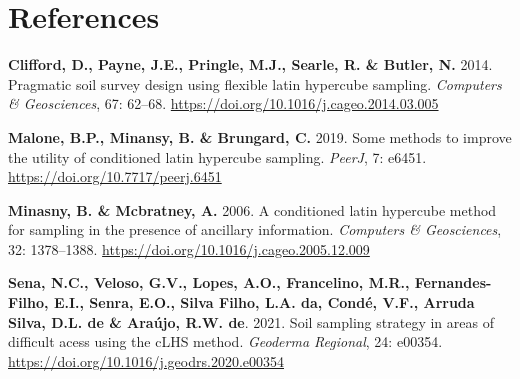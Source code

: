 \documentclass[
]{book}
\newlength{\cslhangindent}
\newlength{\cslentryspacingunit} %
\newenvironment{CSLReferences}[2] %
 {%
  \setlength{\parindent}{0pt}
  \ifodd #1
  \let\oldpar\par
  \def\par{\hangindent=\cslhangindent\oldpar}
  \fi
  \setlength{\parskip}{#2\cslentryspacingunit}
 }%
 {}
\begin{document}
\hypertarget{references}{%
\chapter*{References}\label{references}}

\hypertarget{refs}{}
\begin{CSLReferences}{0}{0}
\leavevmode{}%
\textbf{Clifford, D., Payne, J.E., Pringle, M.J., Searle, R. \& Butler, N.} 2014. Pragmatic soil survey design using flexible latin hypercube sampling. \emph{Computers \& Geosciences}, 67: 62--68. \url{https://doi.org/10.1016/j.cageo.2014.03.005}

\leavevmode{}%
\textbf{Malone, B.P., Minansy, B. \& Brungard, C.} 2019. Some methods to improve the utility of conditioned latin hypercube sampling. \emph{PeerJ}, 7: e6451. \url{https://doi.org/10.7717/peerj.6451}

\leavevmode{}%
\textbf{Minasny, B. \& Mcbratney, A.} 2006. A conditioned latin hypercube method for sampling in the presence of ancillary information. \emph{Computers \& Geosciences}, 32: 1378--1388. \url{https://doi.org/10.1016/j.cageo.2005.12.009}

\leavevmode{}%
\textbf{Sena, N.C., Veloso, G.V., Lopes, A.O., Francelino, M.R., Fernandes-Filho, E.I., Senra, E.O., Silva Filho, L.A. da, Condé, V.F., Arruda Silva, D.L. de \& Araújo, R.W. de}. 2021. Soil sampling strategy in areas of difficult acess using the cLHS method. \emph{Geoderma Regional}, 24: e00354. \url{https://doi.org/10.1016/j.geodrs.2020.e00354}

\end{CSLReferences}
\end{document}
